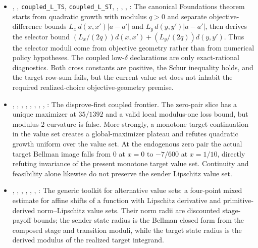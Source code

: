\begin{itemize}[leftmargin=1.4em,itemsep=1pt]
\item {}, , \texttt{coupled\_L\_TS}, \texttt{coupled\_L\_ST}, , , , : The canonical Foundations theorem starts from quadratic growth with modulus \(q>0\) and separate objective-difference bounds \(L_x\,d(x,x')|a-a'|\) and \(L_y\,d(y,y')|a-a'|\), then derives the selector bound \((L_x/(2q))d(x,x')+(L_y/(2q))d(y,y')\). Thus the selector moduli come from objective geometry rather than from numerical policy hypotheses. The coupled low-$\delta$ declarations are only exact-rational diagnostics. Both cross constants are positive, the Schur inequality holds, and the target row-sum fails, but the current value set does not inhabit the required realized-choice objective-geometry premise.
\item {}, , , , , , , , : The disprove-first coupled frontier. The zero-pair slice has a unique maximizer at \(35/1392\) and a valid local modulus-one loss bound, but modulus-\(2\) curvature is false. More strongly, a monotone target continuation in the value set creates a global-maximizer plateau and refutes quadratic growth uniform over the value set. At the endogenous zero pair the actual target Bellman image falls from \(0\) at \(x=0\) to \(-7/600\) at \(x=1/10\), directly refuting invariance of the present monotone target value set. Continuity and feasibility alone likewise do not preserve the sender Lipschitz value set.
\item {}, , , , , , : The generic toolkit for alternative value sets: a four-point mixed estimate for affine shifts of a function with Lipschitz derivative and primitive-derived norm--Lipschitz value sets. Their norm radii are discounted stage-payoff bounds; the sender state radius is the Bellman closed form from the composed stage and transition moduli, while the target state radius is the derived modulus of the realized target integrand.

\end{itemize}

